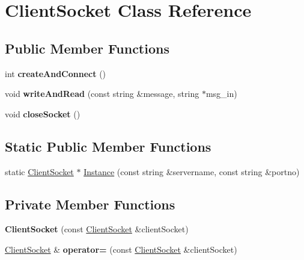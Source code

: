 \hypertarget{classClientSocket}{\section{Client\-Socket Class Reference}
\label{classClientSocket}
}
\subsection*{Public Member Functions}
\begin{DoxyCompactItemize}
\item 
\hypertarget{classClientSocket_af299934a55a0b88e141b35274a3cdcea}{int {\bfseries create\-And\-Connect} ()}\label{classClientSocket_af299934a55a0b88e141b35274a3cdcea}

\item 
\hypertarget{classClientSocket_adfb5189ad7202b82d1eeb70ce5e77960}{void {\bfseries write\-And\-Read} (const string \&message, string $\ast$msg\-\_\-in)}\label{classClientSocket_adfb5189ad7202b82d1eeb70ce5e77960}

\item 
\hypertarget{classClientSocket_a5f98ffaaca563cf848e2d6b719caa80d}{void {\bfseries close\-Socket} ()}\label{classClientSocket_a5f98ffaaca563cf848e2d6b719caa80d}

\end{DoxyCompactItemize}
\subsection*{Static Public Member Functions}
\begin{DoxyCompactItemize}
\item 
static \hyperlink{classClientSocket}{Client\-Socket} $\ast$ \hyperlink{classClientSocket_a4eb39fbb48cec6d8a838c0dc12147f6d}{Instance} (const string \&servername, const string \&portno)
\end{DoxyCompactItemize}
\subsection*{Private Member Functions}
\begin{DoxyCompactItemize}
\item 
\hypertarget{classClientSocket_a0487c7492eabc6c87af2c05fd9e50840}{{\bfseries Client\-Socket} (const \hyperlink{classClientSocket}{Client\-Socket} \&client\-Socket)}\label{classClientSocket_a0487c7492eabc6c87af2c05fd9e50840}

\item 
\hypertarget{classClientSocket_a351935a26d720acd846a39d22f5f135f}{\hyperlink{classClientSocket}{Client\-Socket} \& {\bfseries operator=} (const \hyperlink{classClientSocket}{Client\-Socket} \&client\-Socket)}\label{classClientSocket_a351935a26d720acd846a39d22f5f135f}

\end{DoxyCompactItemize}
